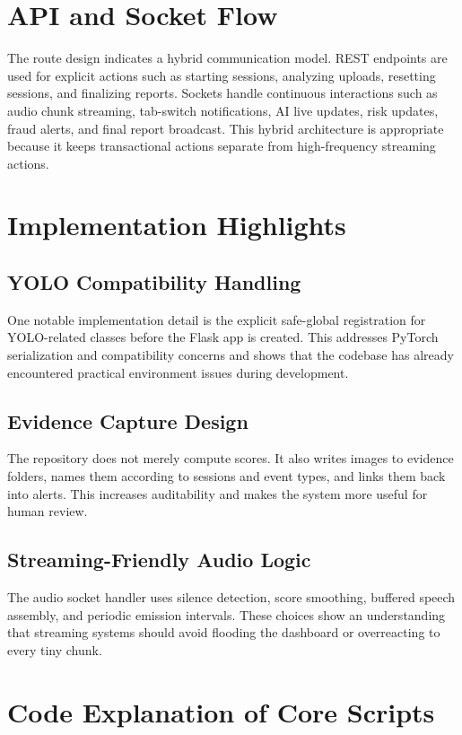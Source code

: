 \documentclass[12pt,a4paper]{extreport}
\begin{document}
\section{API and Socket Flow}
The route design indicates a hybrid communication model. REST endpoints are used for explicit actions such as starting sessions, analyzing uploads, resetting sessions, and finalizing reports. Sockets handle continuous interactions such as audio chunk streaming, tab-switch notifications, AI live updates, risk updates, fraud alerts, and final report broadcast. This hybrid architecture is appropriate because it keeps transactional actions separate from high-frequency streaming actions.

\section{Implementation Highlights}
\subsection{YOLO Compatibility Handling}
One notable implementation detail is the explicit safe-global registration for YOLO-related classes before the Flask app is created. This addresses PyTorch serialization and compatibility concerns and shows that the codebase has already encountered practical environment issues during development.

\subsection{Evidence Capture Design}
The repository does not merely compute scores. It also writes images to evidence folders, names them according to sessions and event types, and links them back into alerts. This increases auditability and makes the system more useful for human review.

\subsection{Streaming-Friendly Audio Logic}
The audio socket handler uses silence detection, score smoothing, buffered speech assembly, and periodic emission intervals. These choices show an understanding that streaming systems should avoid flooding the dashboard or overreacting to every tiny chunk.

\section{Code Explanation of Core Scripts}
\end{document}
